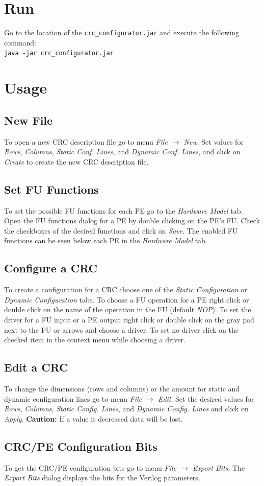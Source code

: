 \documentclass{article}
\begin{document}
\section*{Run}
Go to the location of the \texttt{crc\_configurator.jar} and execute the following command:\\[2mm]
\texttt{java -jar crc\_configurator.jar}\\[2mm]

\section*{Usage}
\subsection*{New File}

To open a new CRC description file go to menu \textit{File $\rightarrow$ New}. Set values for \textit{Rows}, \textit{Columns}, \textit{Static Conf. Lines}, and \textit{Dynamic Conf. Lines}, and click on \textit{Create} to create the new CRC description file.
\subsection*{Set FU Functions}

To set the possible FU functions for each PE go to the \textit{Hardware Model} tab. Open the FU functions dialog for a PE by double clicking on the PE's FU. Check the checkboxes of the desired functions and click on \textit{Save}. The enabled FU functions can be seen below each PE in the \textit{Hardware Model} tab.

\subsection*{Configure a CRC}
To create a configuration for a CRC choose one of the \textit{Static Configuration} or \textit{Dynamic Configuration} tabs. To choose a FU operation for a PE right click or double click on the name of the operation in the FU (default \textit{NOP}). To set the driver for a FU input or a PE output right click or double click on the gray pad next to the FU or arrows and choose a driver. To set no driver click on the checked item in the context menu while choosing a driver.

\subsection*{Edit a CRC}
To change the dimensions (rows and columns) or the amount for static and dynamic configuration lines go to menu \textit{File $\rightarrow$ Edit}. Set the desired values for \textit{Rows}, \textit{Columns}, \textit{Static Config. Lines}, and \textit{Dynamic Config. Lines} and click on \textit{Apply}. \textbf{Caution:} If a value is decreased data will be lost.

\subsection*{CRC/PE Configuration Bits}
To get the CRC/PE configuration bits go to menu \textit{File $\rightarrow$ Export Bits}. The \textit{Export Bits} dialog displays the bits for the Verilog parameters.
\end{document}
